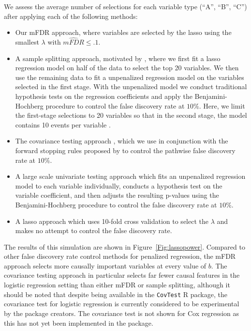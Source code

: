 We assess the average number of selections for each variable type (``A'', ``B'', ``C'') after applying each of the following methods:
\begin{itemize}
\item Our mFDR approach, where variables are selected by the lasso using the smallest $\lambda$ with $\widehat{mFDR} \leq .1$.
\item A sample splitting approach, motivated by \citet{Sample_Splitting}, where we first fit a lasso regression model on half of the data to select the top 20 variables. We then use the remaining data to fit a unpenalized regression model on the variables selected in the first stage. With the unpenalized model we conduct traditional hypothesis tests on the regression coefficients and apply the Benjamini-Hochberg procedure \citep{BH_1995} to control the false discovery rate at $10\%$. Here, we limit the first-stage selections to 20 variables so that in the second stage, the model contains 10 events per variable \citep{peduzzi_epv}.
\item The covariance testing approach \citep{CovTest}, which we use in conjunction with the forward stopping rules proposed by \citet{GSell2016} to control the pathwise false discovery rate at $10\%$. 
\item A large scale univariate testing approach which fits an unpenalized regression model to each variable individually, conducts a hypothesis test on the variable coefficient, and then adjusts the resulting p-values using the Benjamini-Hochberg procedure to control the false discovery rate at $10\%$.
\item A lasso approach which uses 10-fold cross validation to select the $\lambda$ and makes no attempt to control the false discovery rate.
\end{itemize}

The results of this simulation are shown in Figure~\ref{Fig:lassopower}.  Compared to other false discovery rate control methods for penalized regression, the mFDR approach selects more causally important variables at every value of $b$. The covariance testing approach in particular selects far fewer causal features in the logistic regression setting than either mFDR or sample splitting, although it should be noted that despite being available in the {\tt CovTest} R package, the covariance test for logistic regression is currently considered to be experimental by the package creators.  The covariance test is not shown for Cox regression as this has not yet been implemented in the package.

